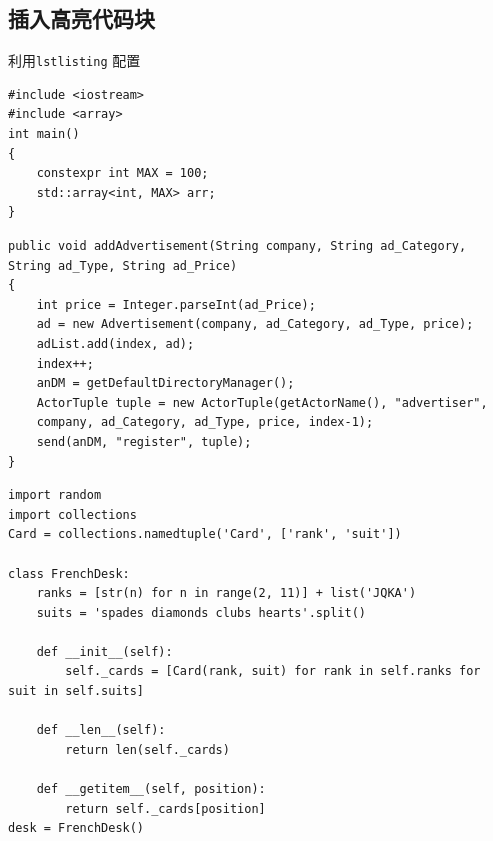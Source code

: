\documentclass[12pt,hyperref,a4paper,UTF8]{ctexart}
\begin{document}
%
%
%
%
%
%

\subsection{插入高亮代码块}
利用\verb|lstlisting| 配置
\begin{lstlisting}[style=CPP, title="c++代码"]
#include <iostream>
#include <array>
int main()
{
    constexpr int MAX = 100;
    std::array<int, MAX> arr;
}  
\end{lstlisting}

\begin{lstlisting}[style=Java, title="Java代码"]
public void addAdvertisement(String company, String ad_Category, String ad_Type, String ad_Price)
{
    int price = Integer.parseInt(ad_Price);
    ad = new Advertisement(company, ad_Category, ad_Type, price);
    adList.add(index, ad);
    index++;
    anDM = getDefaultDirectoryManager();
    ActorTuple tuple = new ActorTuple(getActorName(), "advertiser",
    company, ad_Category, ad_Type, price, index-1);
    send(anDM, "register", tuple);
}
\end{lstlisting}

\begin{lstlisting}[style=Python, title="Python代码"]                
import random
import collections
Card = collections.namedtuple('Card', ['rank', 'suit'])

class FrenchDesk:
    ranks = [str(n) for n in range(2, 11)] + list('JQKA')
    suits = 'spades diamonds clubs hearts'.split()
    
    def __init__(self):
        self._cards = [Card(rank, suit) for rank in self.ranks for suit in self.suits]
        
    def __len__(self):
        return len(self._cards)
        
    def __getitem__(self, position):
        return self._cards[position]
desk = FrenchDesk()
\end{lstlisting}
\end{document}
